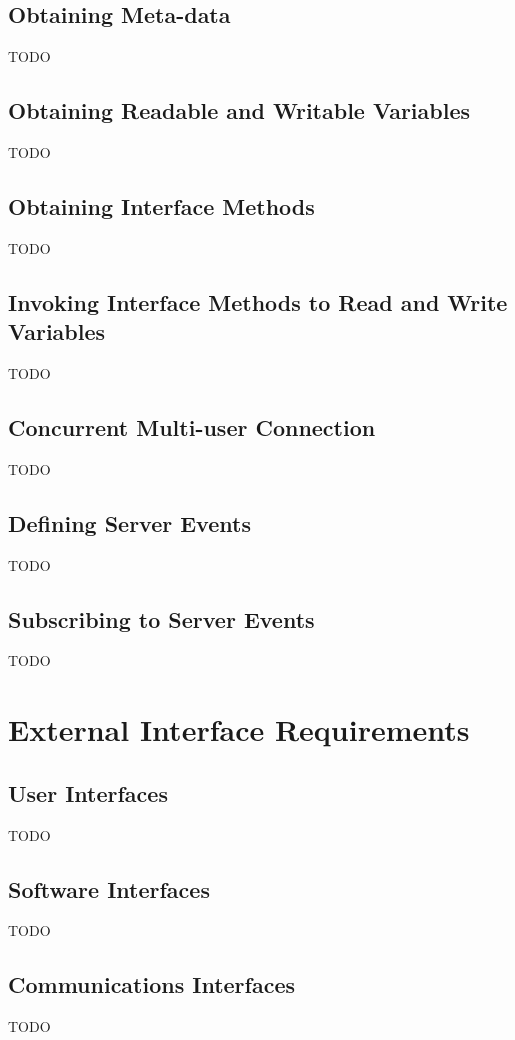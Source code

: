 \section{Obtaining Meta-data}
TODO

\section{Obtaining Readable and Writable Variables}
TODO

\section{Obtaining Interface Methods}
TODO

\section{Invoking Interface Methods to Read and Write Variables}
TODO

\section{Concurrent Multi-user Connection}
TODO

\section{Defining Server Events}
TODO

\section{Subscribing to Server Events}
TODO


\chapter{External Interface Requirements}
\label{External Interface Requirements}

\section{User Interfaces}
TODO

\section{Software Interfaces}
TODO

\section{Communications Interfaces}
TODO


